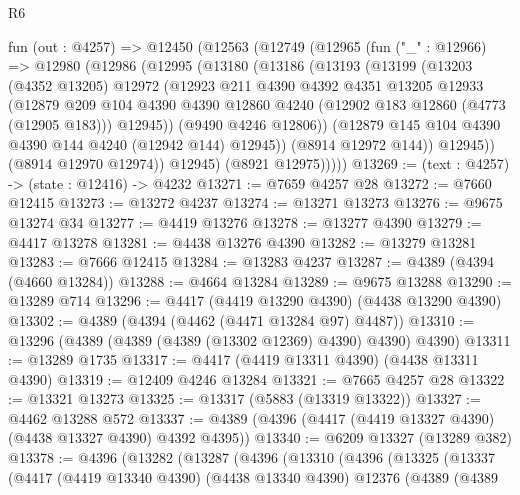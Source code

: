 \begin{lexlean}{R6}
\begin{coremodule}
  fun (out : @4257) =>
  @12450
    (@12563
      (@12749
        (@12965
          (fun ("_" : @12966) =>
          @12980
            (@12986
              (@12995
                (@13180
                  (@13186
                    (@13193
                      (@13199
                        (@13203
                          (@4352 @13205)
                          @12972
                          (@12923
                            @211
                            @4390
                            @4392
                            @4351
                            @13205
                            @12933
                            (@12879
                              @209
                              @104
                              @4390
                              @4390
                              @12860
                              @4240
                              (@12902 @183 @12860 (@4773 (@12905 @183)))
                              @12945))
                          (@9490 @4246 @12806))
                        (@12879 @145 @104 @4390 @4390 @144 @4240 (@12942 @144) @12945))
                      (@8914 @12972 @144))
                    @12945))
                (@8914 @12970 @12974))
              @12945)
            (@8921 @12975)))))
@13269 := (text : @4257) -> (state : @12416) -> @4232
@13271 := @7659 @4257 @28
@13272 := @7660 @12415
@13273 := @13272 @4237
@13274 := @13271 @13273
@13276 := @9675 @13274 @34
@13277 := @4419 @13276
@13278 := @13277 @4390
@13279 := @4417 @13278
@13281 := @4438 @13276 @4390
@13282 := @13279 @13281
@13283 := @7666 @12415
@13284 := @13283 @4237
@13287 := @4389 (@4394 (@4660 @13284))
@13288 := @4664 @13284
@13289 := @9675 @13288
@13290 := @13289 @714
@13296 := @4417 (@4419 @13290 @4390) (@4438 @13290 @4390)
@13302 := @4389 (@4394 (@4462 (@4471 @13284 @97) @4487))
@13310 := @13296 (@4389 (@4389 (@4389 (@13302 @12369) @4390) @4390) @4390)
@13311 := @13289 @1735
@13317 := @4417 (@4419 @13311 @4390) (@4438 @13311 @4390)
@13319 := @12409 @4246 @13284
@13321 := @7665 @4257 @28
@13322 := @13321 @13273
@13325 := @13317 (@5883 (@13319 @13322))
@13327 := @4462 @13288 @572
@13337 := @4389 (@4396 (@4417 (@4419 @13327 @4390) (@4438 @13327 @4390) @4392 @4395))
@13340 := @6209 @13327 (@13289 @382)
@13378 := @4396
    (@13282
      (@13287
        (@4396
          (@13310
            (@4396
              (@13325
                (@13337
                  (@4417
                    (@4419 @13340 @4390)
                    (@4438 @13340 @4390)
                    @12376
                    (@4389
                      (@4389

\end{coremodule}
\end{lexlean}

